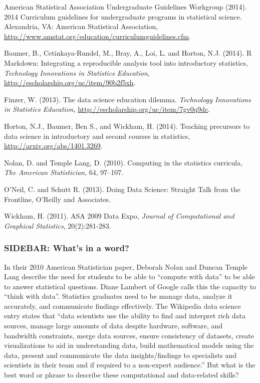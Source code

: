 \documentclass[]{article}
\begin{document}
American Statistical Association Undergraduate Guidelines Workgroup
(2014). 2014 Curriculum guidelines for undergraduate programs in
statistical science. Alexandria, VA: American Statistical Association,
\url{http://www.amstat.org/education/curriculumguidelines.cfm}.

Baumer, B., Cetinkaya-Rundel, M., Bray, A., Loi, L. and Horton, N.J.
(2014). R Markdown: Integrating a reproducible analysis tool into
introductory statistics, \emph{Technology Innovations in Statistics
Education}, \url{http://escholarship.org/uc/item/90b2f5xh}.

Finzer, W. (2013). The data science education dilemma. \emph{Technology
Innovations in Statistics Education},
\url{http://escholarship.org/uc/item/7gv0q9dc}.

Horton, N.J., Baumer, Ben S., and Wickham, H. (2014). Teaching
precursors to data science in introductory and second courses in
statistics, \url{http://arxiv.org/abs/1401.3269}.

Nolan, D. and Temple Lang, D. (2010). Computing in the statistics
curricula, \emph{The American Statistician}, 64, 97--107.

O'Neil, C. and Schutt R. (2013). Doing Data Science: Straight Talk from
the Frontline, O'Reilly and Associates.

Wickham, H. (2011). ASA 2009 Data Expo, \emph{Journal of Computational
and Graphical Statistics}, 20(2):281-283.

\subsubsection{SIDEBAR: What's in a
word?}\label{sidebar-whats-in-a-word}

In their 2010 American Statistician paper, Deborah Nolan and Duncan
Temple Lang describe the need for students to be able to ``compute with
data'' to be able to answer statistical questions. Diane Lambert of
Google calls this the capacity to ``think with data''. Statistics
graduates need to be manage data, analyze it accurately, and communicate
findings effectively. The Wikipedia data science entry states that
``data scientists use the ability to find and interpret rich data
sources, manage large amounts of data despite hardware, software, and
bandwidth constraints, merge data sources, ensure consistency of
datasets, create visualizations to aid in understanding data, build
mathematical models using the data, present and communicate the data
insights/findings to specialists and scientists in their team and if
required to a non-expert audience.'' But what is the best word or phrase
to describe these computational and data-related skills?
\end{document}
